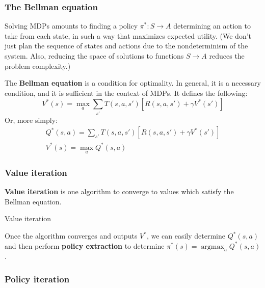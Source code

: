 \documentclass[12pt]{article}
\begin{document}
\subsubsection{The Bellman equation}

Solving MDPs amounts to finding a policy $\pi^* : S \to A$ determining an action to take from each state, in such a way that maximizes expected utility. (We don't just plan the sequence of states and actions due to the nondeterminism of the system. Also, reducing the space of solutions to functions $S \to A$ reduces the problem complexity.)

The \textbf{Bellman equation} is a condition for optimality. In general, it is a necessary condition, and it is sufficient in the context of MDPs. It defines the following:
\[ V^*(s) = \max_a \sum_{s'} T(s, a, s') \left[ R(s, a, s') + \gamma V^*(s') \right] \]
Or, more simply:
\begin{gather*}
Q^*(s, a) = \sum_{s'} T(s, a, s') \left[ R(s, a, s') + \gamma V^*(s') \right] \\
V^*(s) = \max_a Q^*(s, a)
\end{gather*}

\subsubsection{Value iteration}

\textbf{Value iteration} is one algorithm to converge to values which satisfy the Bellman equation.
\begin{algorithm}[h]
\caption{Value iteration}


\end{algorithm}
Once the algorithm converges and outputs $V^*$, we can easily determine $Q^*(s, a)$ and then perform \textbf{policy extraction} to determine $\pi^*(s) = \operatorname{argmax}_a Q^*(s, a)$.

\subsubsection{Policy iteration}
\end{document}
